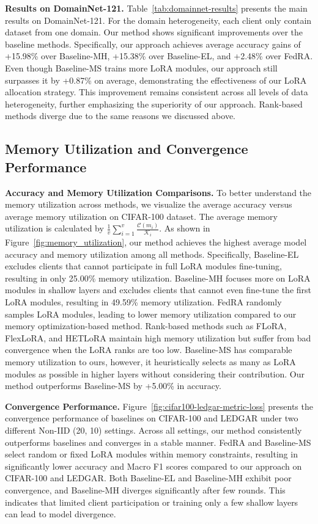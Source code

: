 \documentclass[sigconf]{acmart}
\begin{document}
\textbf{Results on DomainNet-121.} 
Table~\ref{tab:domainnet-results} presents the main results on DomainNet-121. For the domain heterogeneity, each client only contain dataset from one domain. Our method shows significant improvements over the baseline methods. Specifically, our approach achieves average accuracy gains of +15.98\% over Baseline-MH, +15.38\% over Baseline-EL, and +2.48\% over FedRA. Even though Baseline-MS trains more LoRA modules, our approach still surpasses it by +0.87\% on average, demonstrating the effectiveness of our LoRA allocation strategy. This improvement remains consistent across all levels of data heterogeneity, further emphasizing the superiority of our approach. Rank-based methods diverge due to the same reasons we discussed above.

\subsection{Memory Utilization and Convergence Performance}

\textbf{Accuracy and Memory Utilization Comparisons.} {To better understand the memory utilization across methods, we visualize the average accuracy versus average memory utilization on CIFAR-100 dataset.} The average memory utilization is calculated by $\frac{1}{v}\sum_{i=1}^{v}\frac{\mathcal{C}(m_i)}{\mathcal{K}_i}$. As shown in Figure~\ref{fig:memory_utilization}, our method achieves the highest average model accuracy and memory utilization among all methods. Specifically, Baseline-EL excludes clients that cannot participate in full LoRA modules fine-tuning, resulting in only 25.00\% memory utilization. Baseline-MH focuses more on LoRA modules in shallow layers and excludes clients that cannot even fine-tune the first LoRA modules, resulting in 49.59\% memory utilization. FedRA randomly samples LoRA modules, leading to lower memory utilization compared to our memory optimization-based method. Rank-based methods such as FLoRA, FlexLoRA, and HETLoRA maintain high memory utilization but suffer from bad convergence when the LoRA ranks are too low. Baseline-MS has comparable memory utilization to ours, however, it heuristically selects as many as LoRA modules as possible in higher layers without considering their contribution. Our method outperforms Baseline-MS by +5.00\% in accuracy.

\textbf{Convergence Performance.} Figure~\ref{fig:cifar100-ledgar-metric-loss} {presents the convergence performance of baselines on CIFAR-100 and LEDGAR under two different Non-IID (20, 10) settings.} Across all settings, our method consistently outperforms baselines and converges in a stable manner. 
FedRA and Baseline-MS select random or fixed LoRA modules within memory constraints, resulting in significantly lower accuracy and Macro F1 scores compared to our approach on CIFAR-100 and LEDGAR.
Both Baseline-EL and Baseline-MH exhibit poor convergence, and Baseline-MH diverges significantly after few rounds. This indicates that limited client participation or training only a few shallow layers can lead to model divergence.
\end{document}
